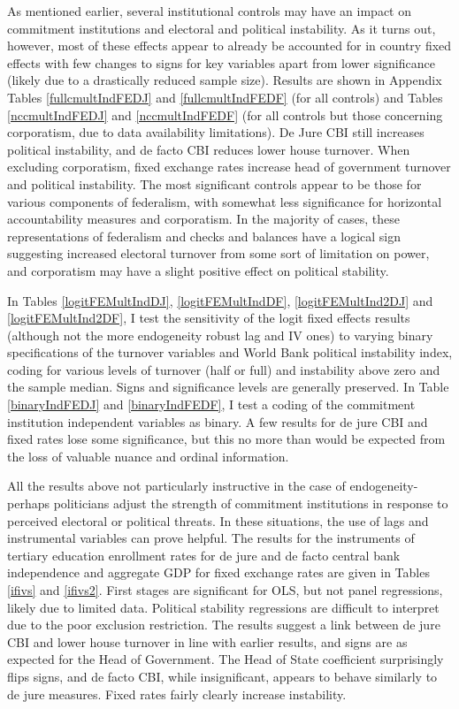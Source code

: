 \documentclass{article}
\begin{document}
    As mentioned earlier, several institutional controls may have an impact on commitment institutions and electoral and political instability. As it turns out, however, most of these effects appear to already be accounted for in country fixed effects with few changes to signs for key variables apart from lower significance (likely due to a drastically reduced sample size). Results are shown in Appendix Tables \ref*{fullcmultIndFEDJ} and \ref*{fullcmultIndFEDF} (for all controls) and Tables \ref*{nccmultIndFEDJ} and \ref*{nccmultIndFEDF} (for all controls but those concerning corporatism, due to data availability limitations). De Jure CBI still increases political instability, and de facto CBI reduces lower house turnover. When excluding corporatism, fixed exchange rates increase head of government turnover and political instability. The most significant controls appear to be those for various components of federalism, with somewhat less significance for horizontal accountability measures and corporatism. In the majority of cases, these representations of federalism and checks and balances have a logical sign suggesting increased electoral turnover from some sort of limitation on power, and corporatism may have a slight positive effect on political stability.

    In Tables \ref*{logitFEMultIndDJ}, \ref*{logitFEMultIndDF}, \ref*{logitFEMultInd2DJ} and \ref*{logitFEMultInd2DF}, I test the sensitivity of the logit fixed effects results (although not the more endogeneity robust lag and IV ones) to varying binary specifications of the turnover variables and World Bank political instability index, coding for various levels of turnover (half or full) and instability above zero and the sample median. Signs and significance levels are generally preserved. In Table \ref*{binaryIndFEDJ} and \ref*{binaryIndFEDF}, I test a coding of the commitment institution independent variables as binary. A few results for de jure CBI and fixed rates lose some significance, but this no more than would be expected from the loss of valuable nuance and ordinal information.

    All the results above not particularly instructive in the case of endogeneity- perhaps politicians adjust the strength of commitment institutions in response to perceived electoral or political threats. In these situations, the use of lags and instrumental variables can prove helpful. The results for the instruments of tertiary education enrollment rates for de jure and de facto central bank independence and aggregate GDP for fixed exchange rates are given in Tables \ref*{ifivs} and \ref*{ifivs2}. First stages are significant for OLS, but not panel regressions, likely due to limited data. Political stability regressions are difficult to interpret due to the poor exclusion restriction. The results suggest a link between de jure CBI and lower house turnover in line with earlier results, and signs are as expected for the Head of Government. The Head of State coefficient surprisingly flips signs, and de facto CBI, while insignificant, appears to behave similarly to de jure measures. Fixed rates fairly clearly increase instability.
\end{document}
